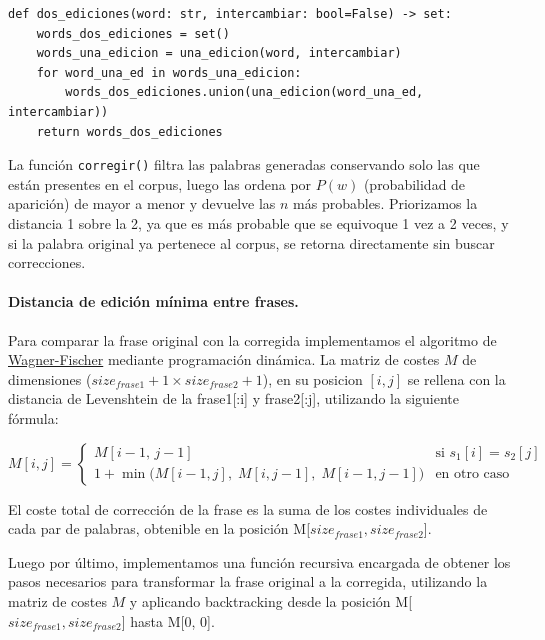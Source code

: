 \documentclass[12pt,a4paper]{article}
\begin{document}
\begin{lstlisting}
def dos_ediciones(word: str, intercambiar: bool=False) -> set:
    words_dos_ediciones = set()
    words_una_edicion = una_edicion(word, intercambiar)
    for word_una_ed in words_una_edicion:
        words_dos_ediciones.union(una_edicion(word_una_ed, intercambiar))
    return words_dos_ediciones
\end{lstlisting}

La función \texttt{corregir()} filtra las palabras generadas conservando 
solo las que están presentes en el corpus, luego las ordena por $P(w)$ 
(probabilidad de aparición) de mayor a menor y devuelve las $n$ más probables. 
Priorizamos la distancia 1 sobre la 2, ya que es más probable que 
se equivoque 1 vez a 2 veces, y si la palabra original ya 
pertenece al corpus, se retorna directamente sin buscar correcciones.

\paragraph{Distancia de edición mínima entre frases.}
Para comparar la frase original con la corregida implementamos el algoritmo de \href{https://en.wikipedia.org/wiki/Wagner\%E2\%80\%93Fischer_algorithm}{Wagner-Fischer} mediante programación dinámica. La matriz de costes $M$ de dimensiones ($size_{frase1}+1 \times size_{frase2}+1$), en su posicion $[i, j]$ se rellena con la distancia de Levenshtein de la frase1[:i] y frase2[:j], utilizando la siguiente fórmula:

\begin{equation}
    M[i,j] = \begin{cases}
        M[i-1,\,j-1] & \text{si } s_1[i] = s_2[j] \\[4pt]
        1 + \min\bigl(M[i-1,j],\; M[i,j-1],\; M[i-1,j-1]\bigr) & \text{en otro caso}
    \end{cases}
\end{equation}

El coste total de corrección de la frase es la suma de los costes individuales de cada par de palabras, obtenible en la posición M[$size_{frase1}, size_{frase2}$]. 

Luego por último, implementamos una función recursiva encargada de obtener los pasos necesarios para transformar la frase original a la corregida, utilizando la matriz de costes $M$ y aplicando backtracking desde la posición M[$size_{frase1}, size_{frase2}$] hasta M[0, 0].

\clearpage
\end{document}
